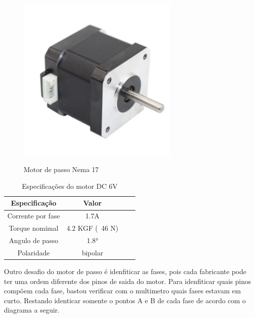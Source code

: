 \begin{figure}[htb]
	\centering
	\caption{Motor de passo Nema 17}
	\includegraphics[width=0.7\textwidth]{figures/JK42HS40_1704_13A}
	\label{Especificacoes_motordc_6v}
\end{figure}

\begin{table}[ht]
	\centering
	\caption{Especificações do motor DC 6V}
	 \begin{tabular}{|c|c|c|c|}
		\hline
		\textbf{Especificação} & \textbf{Valor} \\ \hline
		Corrente por fase & 1.7A  \\ \hline
		Torque nomimal  & 4.2 KGF (~46 N) \\ \hline
		Angulo de passo & 1.8° \\ \hline
		Polaridade & bipolar \\ \hline
	\end{tabular}
	\label{Especificacoes_motordc_6v}
\end{table}


Outro desafio do motor de passo é idenfiticar as fases, pois cada fabricante pode ter uma ordem diferente dos pinos de saida do motor.
Para idenfiticar quais pinos compõem cada fase, bastou verificar com o multimetro quais fases estavam em curto.
Restando identicar somente o pontos A e B de cada fase de acordo com o diagrama a seguir.

